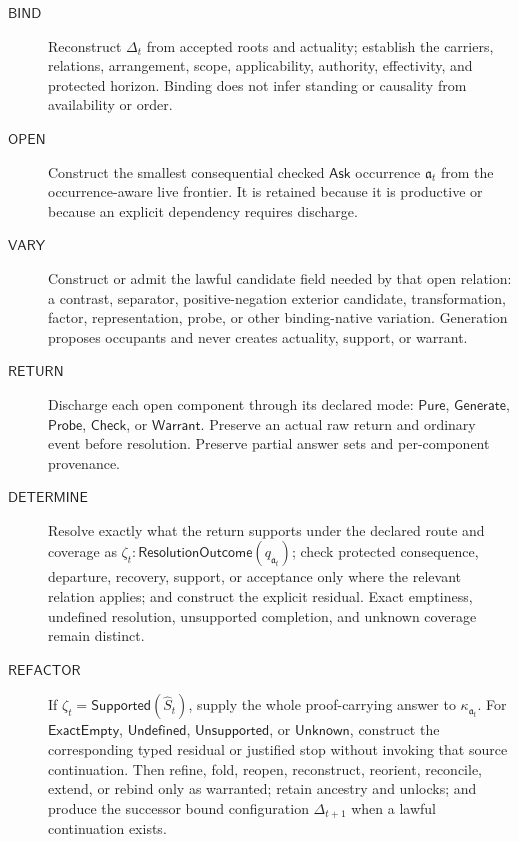 \documentclass[11pt,oneside]{article}
\newcommand{\AskRef}{\mathfrak a}
\begin{document}
\begin{description}
\item[\(\mathsf{BIND}\)] Reconstruct \(\Delta_t\) from accepted roots and actuality; establish the
      carriers, relations, arrangement, scope, applicability, authority, effectivity, and protected
      horizon.  Binding does not infer standing or causality from availability or order.
\item[\(\mathsf{OPEN}\)] Construct the smallest consequential checked \(\mathsf{Ask}\) occurrence
      \(\AskRef_t\) from the occurrence-aware live frontier.  It is retained because it is productive
      or because an explicit dependency requires discharge.
\item[\(\mathsf{VARY}\)] Construct or admit the lawful candidate field needed by that open relation:
      a contrast, separator, positive-negation exterior candidate, transformation, factor,
      representation, probe, or other binding-native variation.  Generation proposes occupants and
      never creates actuality, support, or warrant.
\item[\(\mathsf{RETURN}\)] Discharge each open component through its declared mode:
      \(\mathsf{Pure}\), \(\mathsf{Generate}\), \(\mathsf{Probe}\), \(\mathsf{Check}\), or
      \(\mathsf{Warrant}\).
      Preserve an actual raw return and ordinary event before resolution.  Preserve partial answer
      sets and per-component provenance.
\item[\(\mathsf{DETERMINE}\)] Resolve exactly what the return supports under the declared route and
      coverage as \(\zeta_t:\mathsf{ResolutionOutcome}(q_{\AskRef_t})\); check protected
      consequence, departure, recovery, support, or acceptance only where the relevant relation
      applies; and construct the explicit residual.  Exact emptiness, undefined resolution,
      unsupported completion, and unknown coverage remain distinct.
\item[\(\mathsf{REFACTOR}\)] If
      \(\zeta_t=\mathsf{Supported}(\widehat S_t)\), supply the whole proof-carrying answer to
      \(\kappa_{\AskRef_t}\).  For \(\mathsf{ExactEmpty}\), \(\mathsf{Undefined}\),
      \(\mathsf{Unsupported}\), or \(\mathsf{Unknown}\), construct the corresponding typed residual
      or justified stop without invoking that source continuation.  Then refine, fold, reopen,
      reconstruct, reorient, reconcile, extend, or rebind only as warranted; retain ancestry and
      unlocks; and produce the successor bound configuration \(\Delta_{t+1}\) when a lawful
      continuation exists.
\end{description}
\end{document}
